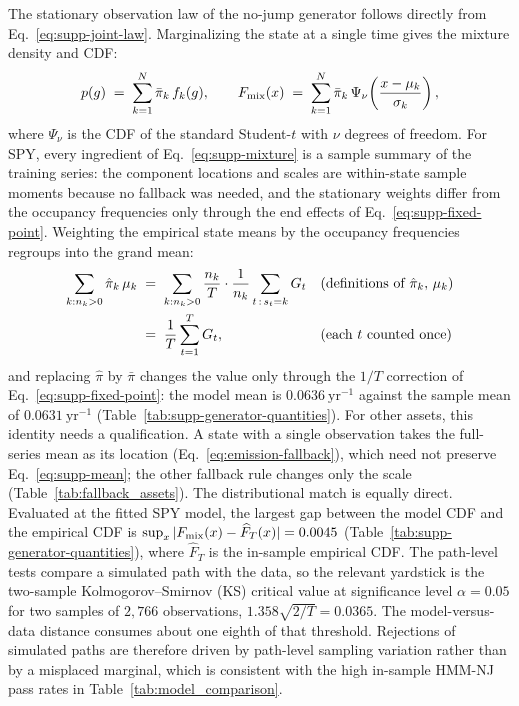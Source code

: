 The stationary observation law of the no-jump generator follows
directly from Eq.~\eqref{eq:supp-joint-law}. Marginalizing the state
at a single time gives the mixture density and CDF:
\begin{equation}
  p(g) \;=\; \sum_{k=1}^{N} \bar\pi_k\, f_k(g),
  \qquad
  F_{\rm mix}(x) \;=\; \sum_{k=1}^{N} \bar\pi_k\,
  \Psi_\nu\!\left(\frac{x - \mu_k}{\sigma_k}\right),
  \label{eq:supp-mixture}
\end{equation}
where $\Psi_\nu$ is the CDF of the standard Student-$t$ with $\nu$
degrees of freedom. For SPY, every ingredient of
Eq.~\eqref{eq:supp-mixture} is a sample summary of the training
series: the component locations and scales are within-state sample
moments because no fallback was needed, and the stationary weights
differ from the occupancy frequencies only through the end effects of
Eq.~\eqref{eq:supp-fixed-point}. Weighting the empirical state means
by the occupancy frequencies regroups into the grand mean:
\begin{align}
  \sum_{k:n_k>0} \hat\pi_k\, \mu_k
   &\;=\; \sum_{k:n_k>0} \frac{n_k}{T} \cdot \frac{1}{n_k}
     \sum_{t \,:\, s_t = k} G_t
     && \text{(definitions of $\hat\pi_k$, $\mu_k$)} \notag \\
   &\;=\; \frac{1}{T} \sum_{t=1}^{T} G_t,
     && \text{(each $t$ counted once)}
  \label{eq:supp-mean}
\end{align}
and replacing $\hat\pi$ by $\bar\pi$ changes the value only through
the $1/T$ correction of Eq.~\eqref{eq:supp-fixed-point}: the model
mean is $0.0636~\mathrm{yr}^{-1}$ against the sample mean of
$0.0631~\mathrm{yr}^{-1}$ (Table~\ref{tab:supp-generator-quantities}).
For other assets, this identity needs a qualification. A state with a
single observation takes the full-series mean as its location
(Eq.~\eqref{eq:emission-fallback}), which need not preserve
Eq.~\eqref{eq:supp-mean}; the other fallback rule changes only the
scale (Table~\ref{tab:fallback_assets}).
The distributional match is equally direct.
Evaluated at the fitted SPY model, the largest gap between the model
CDF and the empirical CDF is
$\sup_x |F_{\rm mix}(x) - \widehat F_T(x)| = 0.0045$
(Table~\ref{tab:supp-generator-quantities}), where
$\widehat F_T$ is the in-sample empirical CDF. The path-level tests
compare a simulated path with the data, so the relevant yardstick is
the two-sample Kolmogorov--Smirnov (KS) critical value at significance
level $\alpha = 0.05$ for two samples of $2{,}766$ observations,
$1.358 \sqrt{2/T} = 0.0365$. The model-versus-data distance consumes
about one eighth of that threshold. Rejections of simulated paths are
therefore driven by path-level sampling variation rather than by a
misplaced marginal, which is consistent with the high in-sample
HMM-NJ pass rates in Table~\ref{tab:model_comparison}.

